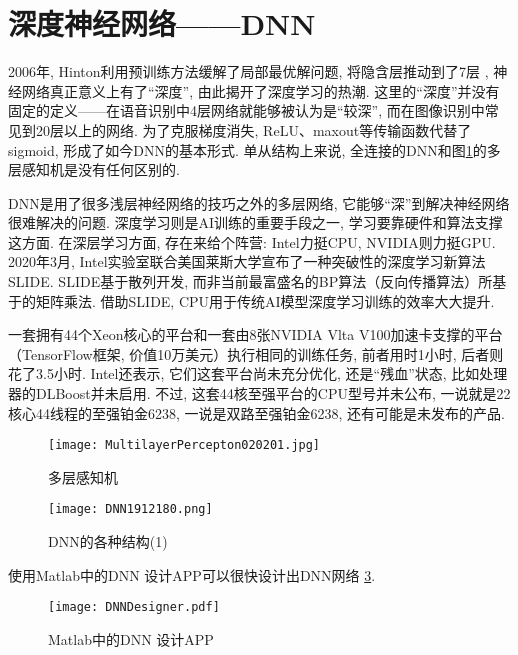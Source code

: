 \section{深度神经网络——DNN}
2006年, Hinton利用预训练方法缓解了局部最优解问题, 将隐含层推动到了7层 \cite{Hinton2006-9587}, 神经网络真正意义上有了“深度”, 由此揭开了深度学习的热潮. 这里的“深度”并没有固定的定义——在语音识别中4层网络就能够被认为是“较深”, 而在图像识别中常见到20层以上的网络. 为了克服梯度消失, ReLU、maxout等传输函数代替了sigmoid, 形成了如今DNN的基本形式. 单从结构上来说, 全连接的DNN和图\ref{MultilayerPercepton020201}的多层感知机是没有任何区别的.

DNN是用了很多浅层神经网络的技巧之外的多层网络, 它能够“深”到解决神经网络很难解决的问题.
深度学习则是AI训练的重要手段之一,  学习要靠硬件和算法支撑 这方面. 在深层学习方面, 存在来给个阵营: Intel力挺CPU, NVIDIA则力挺GPU.
2020年3月, Intel实验室联合美国莱斯大学宣布了一种突破性的深度学习新算法SLIDE.
SLIDE基于散列开发, 而非当前最富盛名的BP算法（反向传播算法）所基于的矩阵乘法.
借助SLIDE, CPU用于传统AI模型深度学习训练的效率大大提升.
\begin{exampleT}
一套拥有44个Xeon核心的平台和一套由8张NVIDIA Vlta V100加速卡支撑的平台（TensorFlow框架, 价值10万美元）执行相同的训练任务, 前者用时1小时, 后者则花了3.5小时.
Intel还表示, 它们这套平台尚未充分优化, 还是“残血”状态, 比如处理器的DLBoost并未启用.
不过, 这套44核至强平台的CPU型号并未公布, 一说就是22核心44线程的至强铂金6238, 一说是双路至强铂金6238, 还有可能是未发布的产品.
\end{exampleT}

\begin{figure}[H]
\centering
\texttt{[image: MultilayerPercepton020201.jpg]}
\caption{多层感知机}
\label{MultilayerPercepton020201}
\end{figure}

\begin{figure}[H]
\centering
\texttt{[image: DNN1912180.png]}
\caption{DNN的各种结构(1)}
\label{DNN191218121500010}
\end{figure}
使用Matlab中的DNN 设计APP可以很快设计出DNN网络 \ref{DNNDesigner20200304}.
\begin{figure}[H]
\centering
\texttt{[image: DNNDesigner.pdf]}
\caption{Matlab中的DNN 设计APP}
\label{DNNDesigner20200304}
\end{figure}

